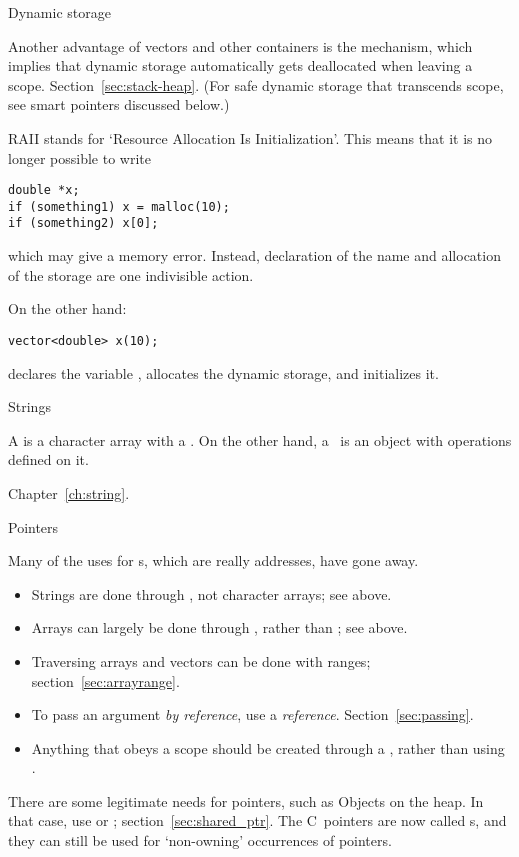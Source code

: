  {Dynamic storage}

Another advantage of vectors and other containers is the 
mechanism, which implies that dynamic storage automatically gets
deallocated when leaving a scope. Section~\ref{sec:stack-heap}. (For
safe dynamic storage that transcends scope, see smart pointers
discussed below.)

RAII stands for `Resource Allocation Is Initialization'. This means
that it is no longer possible to write
\begin{verbatim}
double *x;
if (something1) x = malloc(10);
if (something2) x[0];
\end{verbatim}
which may give a memory error.
Instead, declaration of the
name and allocation of the storage are one indivisible action.

On the other hand:
\begin{lstlisting}
vector<double> x(10);
\end{lstlisting}
declares the variable , allocates the dynamic storage, and
initializes it.

 {Strings}

A  is a character array with a . On the other hand, a~ is an object
with operations defined on it.

Chapter~\ref{ch:string}.

 {Pointers}

Many of the uses for s, which are
really addresses, have gone away.
\begin{itemize}
\item Strings are done through , not character arrays;
  see above.
\item Arrays can largely be done through , rather than
  ; see above.
\item Traversing arrays and vectors can be done with ranges;
  section~\ref{sec:arrayrange}.
\item To pass an argument
  \emph{by reference},
  use a \emph{reference}.
  Section~\ref{sec:passing}.
\item Anything that obeys a scope should be created through a
  , rather than using .
\end{itemize}

There are some legitimate needs for pointers, such as Objects on the
heap. In that case, use  or ;
section~\ref{sec:shared_ptr}.
The C~pointers are now called s, and they
can still be used for `non-owning' occurrences of pointers.

